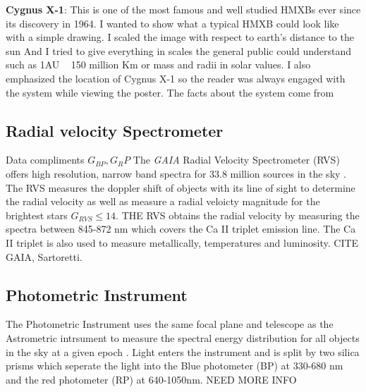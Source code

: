 \documentclass{article}
\begin{document}
	\newline
	\textbf{Cygnus X-1}: This is one of the most famous and well studied HMXBs ever since its discovery in 1964. I wanted to show what a typical HMXB could look like with a simple drawing. I scaled the image with respect to earth's distance to the sun And I tried to give everything in scales the general public could understand such as 1AU ~ 150 million Km or mass and radii in solar values. I also emphasized the location of Cygnus X-1 so the reader was always engaged with the system while viewing the poster. The facts about the system come from \cite{CygnusX-1}
	
	
	\subsection{Radial velocity Spectrometer}
	Data compliments $G_{BP} , G_RP$
	The \textit{GAIA} Radial Velocity Spectrometer (RVS) offers high resolution, narrow band spectra for 33.8 million sources in the sky \cite{GAIA}. The RVS measures the doppler shift of objects with its line of sight to determine the radial velocity as well as measure a radial veloicty magnitude for the brightest stars $G_{RVS} \leq 14 $. THE RVS obtains the radial velocity by measuring the spectra between 845-872 nm which covers the Ca II triplet emission line. The Ca II triplet is also used to measure metallically, temperatures and luminosity. CITE GAIA,  Sartoretti.
	\subsection{Photometric Instrument}
	The Photometric Instrument uses the same focal plane and telescope as the Astrometric intrsument to measure the spectral energy distribution for all objects in the sky at a given epoch \cite{GAIA}. Light enters the instrument and is split by two silica prisms which seperate the light into the Blue photometer (BP) at 330-680 nm and the red photometer (RP) at 640-1050nm. NEED MORE INFO
	
	
	
\end{document}
